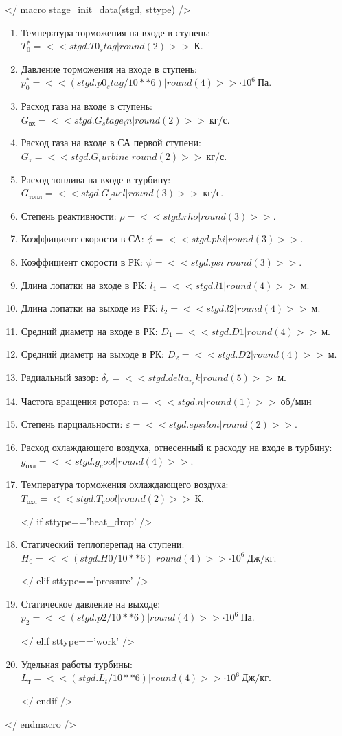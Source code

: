 \documentclass[a4paper,10pt]{article}
\begin{document}
    </ macro stage_init_data(stgd, sttype) />
    \begin{enumerate}

        \item Температура торможения на входе в ступень: $T_0^* = << stgd.T0_stag | round(2) >>\ К $.
        \item Давление торможения на входе в ступень: $p_0^* = << (stgd.p0_stag / 10**6) | round(4) >> \cdot 10^6 \ Па$.
        \item Расход газа на входе в ступень: $G_{вх} = << stgd.G_stage_in | round(2) >>\ кг/с$.
        \item Расход газа на входе в СА первой ступени: $ G_т = << stgd.G_turbine | round(2) >>\ кг/с $.
        \item Расход топлива на входе в турбину: $ G_{топл} = << stgd.G_fuel | round(3) >>\ кг/с $.
        \item Степень реактивности: $ \rho = << stgd.rho | round(3) >> $.
        \item Коэффициент скорости в СА: $ \phi = << stgd.phi | round(3) >> $.
        \item Коэффициент скорости в РК: $ \psi = << stgd.psi | round(3) >> $.
        \item Длина лопатки на входе в РК: $ l_1 = << stgd.l1 | round(4) >>\ м $.
        \item Длина лопатки на выходе из РК: $ l_2 = << stgd.l2 | round(4) >>\ м $.
        \item Средний диаметр на входе в РК: $ D_1 = << stgd.D1 | round(4) >>\ м $.
        \item Средний диаметр на выходе в РК: $ D_2 = << stgd.D2 | round(4) >>\ м $.
        \item Радиальный зазор: $ \delta_r = << stgd.delta_r_rk | round(5) >>\ м $.
        \item Частота вращения ротора: $ n = << stgd.n | round(1) >>\ об/мин $
        \item Степень парциальности: $ \varepsilon = << stgd.epsilon | round(2) >> $.
        \item Расход охлаждающего воздуха, отнесенный к расходу на входе в турбину: $ g_{охл} = << stgd.g_cool | round(4) >> $.
        \item Температура торможения охлаждающего воздуха: $ T_{охл} = << stgd.T_cool | round(2) >>\ К $.

        </ if sttype=='heat_drop' />
        \item Статический теплоперепад на ступени: $ H_0 = << (stgd.H0 / 10**6) | round(4) >> \cdot 10^6 \ Дж/кг $.

        </ elif sttype=='pressure' />
        \item Статическое давление на выходе: $ p_2 = << (stgd.p2 / 10**6) | round(4) >> \cdot 10^6 \ Па $.

        </ elif sttype=='work' />
        \item Удельная работы турбины: $ L_т = << (stgd.L_t / 10**6) | round(4)  >> \cdot 10^6 \ Дж/кг $.

        </ endif />

    \end{enumerate}
    </ endmacro />
\end{document}
